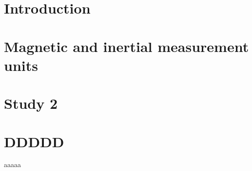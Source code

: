 

\setlength{\parindent}{0pt}



\tableofcontents

\chapter{Introduction}  \setcounter{page}{1}


\chapter{Magnetic and inertial measurement units}


\chapter{Study 2}



\chapter{DDDDD}
aaaaa




